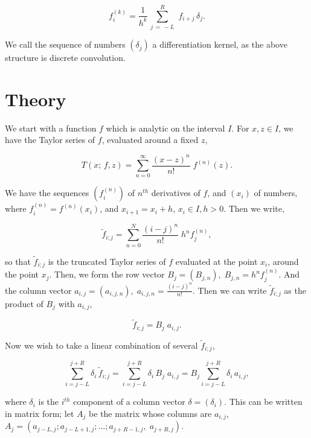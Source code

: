 \documentclass[amsmath,amssymb,floatfix]{revtex4}
\numberwithin{equation}{section}
\begin{document}
\begin{equation}
	f^{(k)}_i = \frac{1}{h^k} \, \sum_{j\,=\,-L}^{R} \, \, f_{i+j} \,  \delta_j.
\end{equation}

We call the sequence of numbers $(\delta_j)$ a differentiation kernel, as the above structure is discrete convolution.

\section{\label{sec:level1}Theory\protect}

\noindent
We start with a function $f$ which is analytic on the interval $I$. For $x, z \in I$, we have the Taylor series of $f$, evaluated around a fixed $z$,

\begin{equation}
	T(x;\, f,z) = \sum_{n=0}^{\infty} \frac{(x-z)^n}{n!} \; f^{(n)}(z).
\end{equation}

\noindent
We have the sequences $(f^{(n)}_i)$ of $n^{th}$ derivatives of $f$, and $(x_i)$ of numbers, where $f^{(n)}_i = f^{(n)}(x_i)$, and $x_{i+1}=x_{i} + h$, $x_i \in I, h>0$. Then we write,

\begin{equation}
	\tilde{f}_{i;j} = \sum_{n=0}^{N} \frac{ (i-j)^n}{n!} \; h^n f^{(n)}_j,
\end{equation}

so that $\tilde{f}_{i;j}$ is the truncated Taylor series of $f$ evaluated at the point $x_i$, around the point $x_j$.
Then, we form the row vector $B_j = (B_{j,n}), \; B_{j,n} = h^n f^{(n)}_j$. And the column vector $a_{i,j} = (a_{i,j,n}), \; a_{i,j,n} = \frac{(i-j)^n}{n!}$. Then we can write $\tilde{f}_{i;j}$ as the product of $B_j$ with $ a_{i,j}$,

\begin{equation}
	\tilde{f}_{i;j} = B_j  \;   a_{i,j}.
\end{equation}

\noindent
Now we wish to take a linear combination of several $\tilde{f}_{i;j}$,

\begin{equation}
	\sum_{i=j-L}^{j+R} \delta_i \, \tilde{f}_{i;j}  = \sum_{i=j-L}^{j+R} \delta_i \, B_j  \;   a_{i,j}  = B_j   \sum_{i=j-L}^{j+R}  \delta_i \,  a_{i,j},
\end{equation}

\noindent
where $\delta_i$ is the $i^{th}$ component of a column vector $\delta= (\delta_i)$. This can be written in matrix form; let $A_j$ be the matrix whose columns are $a_{i,j}$, $A_j = (a_{j-L,j};a_{j-L+1,j};...;a_{j+R-1,j},\;a_{j+R,j})$.
\end{document}
